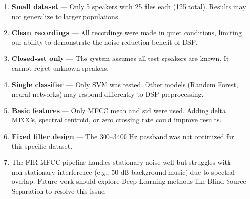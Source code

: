 \begin{enumerate}
  \item \textbf{Small dataset} — Only 5 speakers with 25 files each (125 total). Results may not generalize to larger populations.
  \item \textbf{Clean recordings} — All recordings were made in quiet conditions, limiting our ability to demonstrate the noise-reduction benefit of DSP.
  \item \textbf{Closed-set only} — The system assumes all test speakers are known. It cannot reject unknown speakers.
  \item \textbf{Single classifier} — Only SVM was tested. Other models (Random Forest, neural networks) may respond differently to DSP preprocessing.
  \item \textbf{Basic features} — Only MFCC mean and std were used. Adding delta MFCCs, spectral centroid, or zero crossing rate could improve results.
  \item \textbf{Fixed filter design} — The 300–3400 Hz passband was not optimized for this specific dataset.
  \item The FIR-MFCC pipeline handles stationary noise well but struggles with non-stationary interference (e.g., 50 dB background music) due to spectral overlap. Future work should explore Deep Learning methods like Blind Source Separation to resolve this issue.
\end{enumerate}